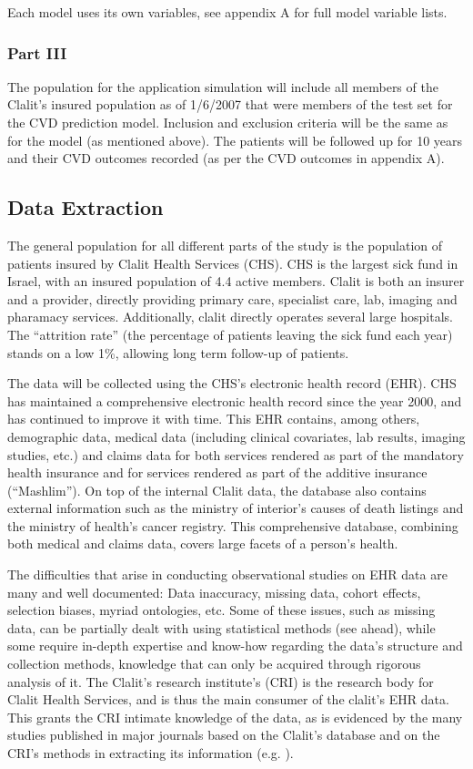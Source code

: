 \documentclass[a4paper,12pt]{article}
\begin{document}
		Each model uses its own variables, see appendix A for full model variable lists.
	
		\subsubsection{Part III}
		The population for the application simulation will include all members of the Clalit's insured population as of 1/6/2007 that were members of the test set for the CVD prediction model. Inclusion and exclusion criteria will be the same as for the model (as mentioned above). The patients will be followed up for 10 years and their CVD outcomes recorded (as per the CVD outcomes in appendix A).
		
	\subsection{Data Extraction}
	The general population for all different parts of the study is the population of patients insured by Clalit Health Services (CHS). CHS is the largest sick fund in Israel, with an insured population of 4.4 active members. Clalit is both an insurer and a provider, directly providing primary care, specialist care, lab, imaging and pharamacy services. Additionally, clalit directly operates several large hospitals. The “attrition rate” (the percentage of patients leaving the sick fund each year) stands on a low 1\%, allowing long term follow-up of patients.
	
	The data will be collected using the CHS's electronic health record (EHR). CHS has maintained a comprehensive electronic health record since the year 2000, and has continued to improve it with time. This EHR contains, among others, demographic data, medical data (including clinical covariates, lab results, imaging studies, etc.) and claims data for both services rendered as part of the mandatory health insurance and for services rendered as part of the additive insurance (“Mashlim”). On top of the internal Clalit data, the database also contains external information such as the ministry of interior's causes of death listings and the ministry of health's cancer registry. This comprehensive database, combining both medical and claims data, covers large facets of a person's health.
	
	The difficulties that arise in conducting observational studies on EHR data are many and well documented: Data inaccuracy, missing data, cohort effects, selection biases, myriad ontologies, etc\cite{Hripcsak2011,Jensen2012,Goldstein2017}. Some of these issues, such as missing data, can be partially dealt with using statistical methods (see ahead), while some require in-depth expertise and know-how regarding the data's structure and collection methods, knowledge that can only be acquired through rigorous analysis of it. The Clalit's research institute's (CRI) is the research body for Clalit Health Services, and is thus the main consumer of the clalit's EHR data. This grants the CRI intimate knowledge of the data, as is evidenced by the many studies published in major journals based on the Clalit's database and on the CRI's methods in extracting its information (e.g. \cite{Reges2018,Dagan2017}).
	
\end{document}
